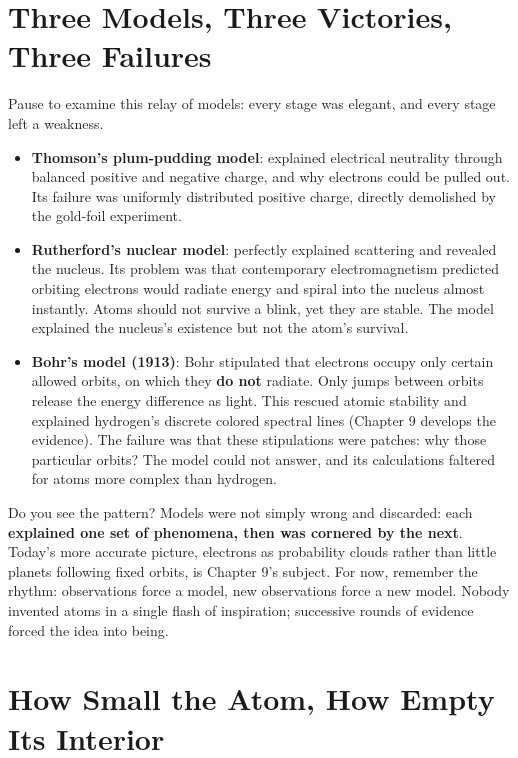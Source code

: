 \section{Three Models, Three Victories, Three Failures}

Pause to examine this relay of models: every stage was elegant, and every stage left a weakness.

\begin{itemize}[itemsep=2pt]
\item \textbf{Thomson's plum-pudding model}: explained electrical neutrality through balanced positive and negative charge, and why electrons could be pulled out. Its failure was uniformly distributed positive charge, directly demolished by the gold-foil experiment.
\item \textbf{Rutherford's nuclear model}: perfectly explained scattering and revealed the nucleus. Its problem was that contemporary electromagnetism predicted orbiting electrons would radiate energy and spiral into the nucleus almost instantly. Atoms should not survive a blink, yet they are stable. The model explained the nucleus's existence but not the atom's survival.
\item \textbf{Bohr's model (1913)}: Bohr stipulated that electrons occupy only certain allowed orbits, on which they \textbf{do not} radiate. Only jumps between orbits release the energy difference as light. This rescued atomic stability and explained hydrogen's discrete colored spectral lines (Chapter 9 develops the evidence). The failure was that these stipulations were patches: why those particular orbits? The model could not answer, and its calculations faltered for atoms more complex than hydrogen.
\end{itemize}

Do you see the pattern? Models were not simply wrong and discarded: each \textbf{explained one set of phenomena, then was cornered by the next}. Today's more accurate picture, electrons as probability clouds rather than little planets following fixed orbits, is Chapter 9's subject. For now, remember the rhythm: observations force a model, new observations force a new model. Nobody invented atoms in a single flash of inspiration; successive rounds of evidence forced the idea into being.

\section{How Small the Atom, How Empty Its Interior}

